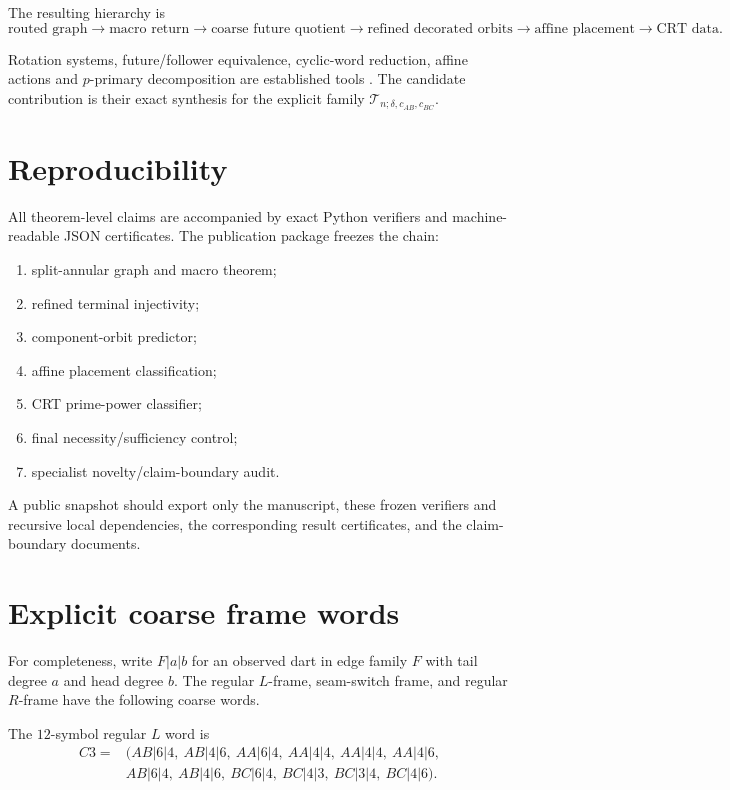 \documentclass[11pt,a4paper]{article}
\theoremstyle{definition}
\providecommand{\T}{}
\renewcommand{\T}{\mathcal T}
\begin{document}
The resulting hierarchy is
\[
\boxed{
\text{routed graph}
\to
\text{macro return}
\to
\text{coarse future quotient}
\to
\text{refined decorated orbits}
\to
\text{affine placement}
\to
\text{CRT data}.
}
\]

Rotation systems, future/follower equivalence, cyclic-word reduction, affine actions and \(p\)-primary decomposition are established tools
\cite{LindMarcus2021,Johansen2011,GrossTucker1977,BorsWang2022,DuttaPrasad2011,Cao2011}.
The candidate contribution is their exact synthesis for the explicit family \(\T_{n;\delta,c_{AB},c_{BC}}\).

\section{Reproducibility}

All theorem-level claims are accompanied by exact Python verifiers and machine-readable JSON certificates.
The publication package freezes the chain:

\begin{enumerate}
\item split-annular graph and macro theorem;
\item refined terminal injectivity;
\item component-orbit predictor;
\item affine placement classification;
\item CRT prime-power classifier;
\item final necessity/sufficiency control;
\item specialist novelty/claim-boundary audit.
\end{enumerate}

A public snapshot should export only the manuscript, these frozen verifiers and recursive local dependencies, the corresponding result certificates, and the claim-boundary documents.

\appendix

\section{Explicit coarse frame words}\label{app:frames}

For completeness, write \(F|a|b\) for an observed dart in edge family \(F\)
with tail degree \(a\) and head degree \(b\).
The regular \(L\)-frame, seam-switch frame, and regular \(R\)-frame have
the following coarse words.

The \(12\)-symbol regular \(L\) word is
\[
\begin{aligned}
C3={}&(
AB|6|4,\ AB|4|6,\ AA|6|4,\ AA|4|4,\ AA|4|4,\ AA|4|6,\\
&AB|6|4,\ AB|4|6,\ BC|6|4,\ BC|4|3,\ BC|3|4,\ BC|4|6).
\end{aligned}
\]
\end{document}
